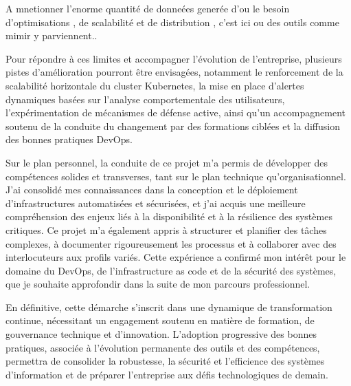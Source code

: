 A mnetionner l'enorme quantité de donneées generée d'ou le besoin d'optimisations , de scalabilité et de distribution , c'est ici ou des outils comme mimir y parviennent..

Pour répondre à ces limites et accompagner l’évolution de l’entreprise, plusieurs pistes d’amélioration pourront être envisagées, notamment le renforcement de la scalabilité horizontale du cluster Kubernetes, la mise en place d’alertes dynamiques basées sur l’analyse comportementale des utilisateurs, l’expérimentation de mécanismes de défense active, ainsi qu’un accompagnement soutenu de la conduite du changement par des formations ciblées et la diffusion des bonnes pratiques DevOps.

Sur le plan personnel, la conduite de ce projet m’a permis de développer des compétences solides et transverses, tant sur le plan technique qu’organisationnel. J’ai consolidé mes connaissances dans la conception et le déploiement d’infrastructures automatisées et sécurisées, et j’ai acquis une meilleure compréhension des enjeux liés à la disponibilité et à la résilience des systèmes critiques. Ce projet m’a également appris à structurer et planifier des tâches complexes, à documenter rigoureusement les processus et à collaborer avec des interlocuteurs aux profils variés. Cette expérience a confirmé mon intérêt pour le domaine du DevOps, de l’infrastructure as code et de la sécurité des systèmes, que je souhaite approfondir dans la suite de mon parcours professionnel.

En définitive, cette démarche s’inscrit dans une dynamique de transformation continue, nécessitant un engagement soutenu en matière de formation, de gouvernance technique et d’innovation. L’adoption progressive des bonnes pratiques, associée à l’évolution permanente des outils et des compétences, permettra de consolider la robustesse, la sécurité et l’efficience des systèmes d’information et de préparer l’entreprise aux défis technologiques de demain.